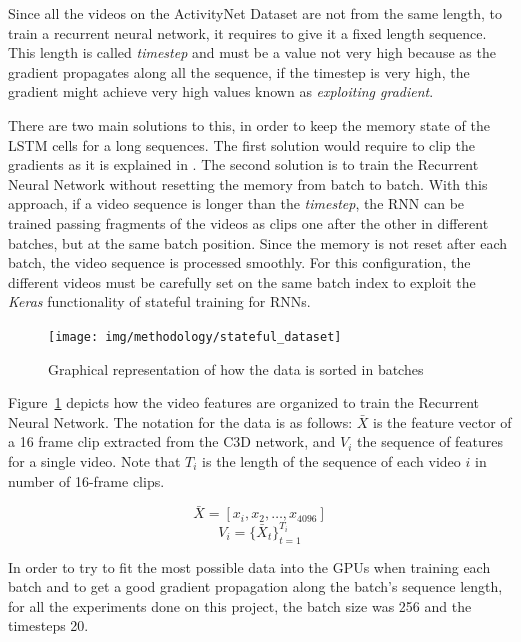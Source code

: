 Since all the videos on the ActivityNet Dataset are not from the same length, to train a recurrent neural network, it requires to give it a fixed length sequence. This length is called \textit{timestep} and must be a value not very high because as the gradient propagates along all the sequence, if the timestep is very high, the gradient might achieve very high values known as \textit{exploiting gradient}.

There are two main solutions to this, in order to keep the memory state of the LSTM cells for a long sequences. The first solution would require to clip the gradients as it is explained in \cite{pascanu2012difficulty}. The second solution is to train the Recurrent Neural Network without resetting the memory from batch to batch. With this approach, if a video sequence is longer than the \textit{timestep}, the RNN can be trained passing fragments of the videos as clips one after the other in different batches, but at the same batch position. Since the memory is not reset after each batch, the video sequence is processed smoothly. For this configuration, the different videos must be carefully set on the same batch index to exploit the \textit{Keras} functionality of stateful training for RNNs.

\begin{figure}[H]
\begin{center}
\texttt{[image: img/methodology/stateful\_dataset]}
\end{center}
\caption{Graphical representation of how the data is sorted in batches}
\label{fig:stateful_dataset}
\end{figure}

Figure~\ref{fig:stateful_dataset} depicts how the video features are organized to train the Recurrent Neural Network. The notation for the data is as follows: $\bar{X}$ is the feature vector of a 16 frame clip extracted from the C3D network, and $V_i$ the sequence of features for a single video. Note that $T_i$ is the length of the sequence of each video $i$ in number of 16-frame clips.

\begin{equation}
	\bar{X} = [x_i, x_2, \ldots, x_{4096}]
\end{equation}
\begin{equation}
	V_i = \{ \bar{X}_t \}_{t=1}^{T_i}
\end{equation}

In order to try to fit the most possible data into the GPUs when training each batch and to get a good gradient propagation along the batch's sequence length, for all the experiments done on this project, the batch size was 256 and the timesteps 20. %

